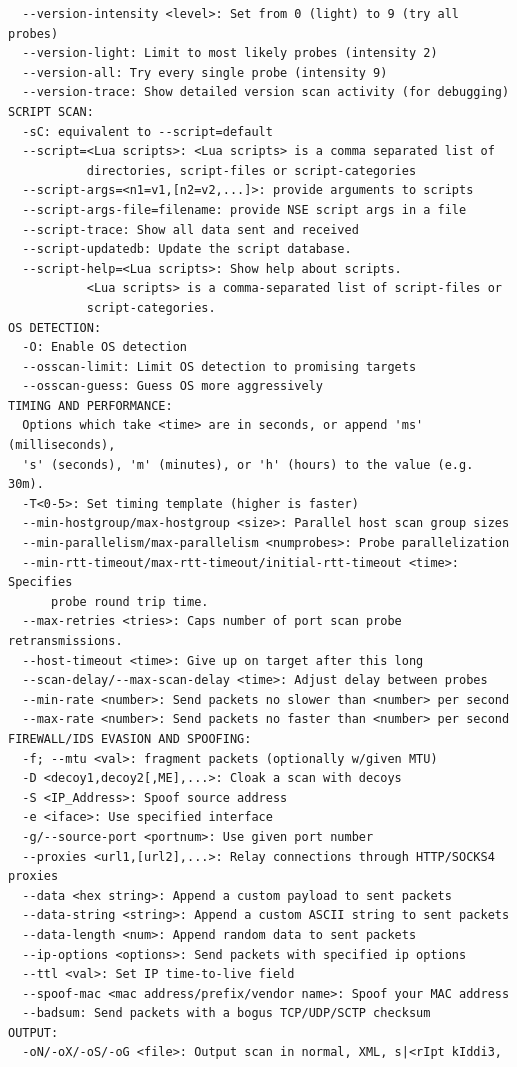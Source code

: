 \documentclass{article}
\begin{document}
\begin{lstlisting}
  --version-intensity <level>: Set from 0 (light) to 9 (try all probes)
  --version-light: Limit to most likely probes (intensity 2)
  --version-all: Try every single probe (intensity 9)
  --version-trace: Show detailed version scan activity (for debugging)
SCRIPT SCAN:
  -sC: equivalent to --script=default
  --script=<Lua scripts>: <Lua scripts> is a comma separated list of
           directories, script-files or script-categories
  --script-args=<n1=v1,[n2=v2,...]>: provide arguments to scripts
  --script-args-file=filename: provide NSE script args in a file
  --script-trace: Show all data sent and received
  --script-updatedb: Update the script database.
  --script-help=<Lua scripts>: Show help about scripts.
           <Lua scripts> is a comma-separated list of script-files or
           script-categories.
OS DETECTION:
  -O: Enable OS detection
  --osscan-limit: Limit OS detection to promising targets
  --osscan-guess: Guess OS more aggressively
TIMING AND PERFORMANCE:
  Options which take <time> are in seconds, or append 'ms' (milliseconds),
  's' (seconds), 'm' (minutes), or 'h' (hours) to the value (e.g. 30m).
  -T<0-5>: Set timing template (higher is faster)
  --min-hostgroup/max-hostgroup <size>: Parallel host scan group sizes
  --min-parallelism/max-parallelism <numprobes>: Probe parallelization
  --min-rtt-timeout/max-rtt-timeout/initial-rtt-timeout <time>: Specifies
      probe round trip time.
  --max-retries <tries>: Caps number of port scan probe retransmissions.
  --host-timeout <time>: Give up on target after this long
  --scan-delay/--max-scan-delay <time>: Adjust delay between probes
  --min-rate <number>: Send packets no slower than <number> per second
  --max-rate <number>: Send packets no faster than <number> per second
FIREWALL/IDS EVASION AND SPOOFING:
  -f; --mtu <val>: fragment packets (optionally w/given MTU)
  -D <decoy1,decoy2[,ME],...>: Cloak a scan with decoys
  -S <IP_Address>: Spoof source address
  -e <iface>: Use specified interface
  -g/--source-port <portnum>: Use given port number
  --proxies <url1,[url2],...>: Relay connections through HTTP/SOCKS4 proxies
  --data <hex string>: Append a custom payload to sent packets
  --data-string <string>: Append a custom ASCII string to sent packets
  --data-length <num>: Append random data to sent packets
  --ip-options <options>: Send packets with specified ip options
  --ttl <val>: Set IP time-to-live field
  --spoof-mac <mac address/prefix/vendor name>: Spoof your MAC address
  --badsum: Send packets with a bogus TCP/UDP/SCTP checksum
OUTPUT:
  -oN/-oX/-oS/-oG <file>: Output scan in normal, XML, s|<rIpt kIddi3,

\end{lstlisting}
\end{document}

